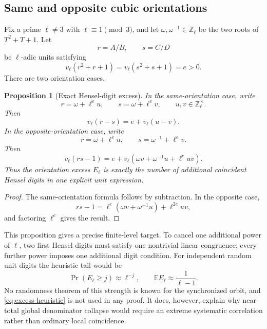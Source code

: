 \documentclass[11pt]{article}
\newtheorem{proposition}[theorem]{Proposition}
\theoremstyle{definition}
\theoremstyle{remark}
\newcommand{\Z}{\mathbb{Z}}
\begin{document}
\subsection{Same and opposite cubic orientations}

Fix a prime $\ell\ne3$ with $\ell\equiv1\pmod3$, and let $\omega,\omega^{-1}\in\Z_\ell$ be the two roots of $T^2+T+1$.  Let
\[
 r=A/B,
 \qquad s=C/D
\]
be $\ell$-adic units satisfying
\[
 v_\ell(r^2+r+1)=v_\ell(s^2+s+1)=e>0.
\]
There are two orientation cases.

\begin{proposition}[Exact Hensel-digit excess]\label{prop:Hensel-excess}
In the same-orientation case, write
\begin{equation}\label{eq:same-Hensel}
 r=\omega+\ell^e u,
 \qquad
 s=\omega+\ell^e v,
 \qquad u,v\in\Z_\ell^\times.
\end{equation}
Then
\begin{equation}\label{eq:same-excess}
 v_\ell(r-s)=e+v_\ell(u-v).
\end{equation}
In the opposite-orientation case, write
\begin{equation}\label{eq:opp-Hensel}
 r=\omega+\ell^e u,
 \qquad
 s=\omega^{-1}+\ell^e v.
\end{equation}
Then
\begin{equation}\label{eq:opp-excess}
 v_\ell(rs-1)
 =e+v_\ell\!\left(\omega v+\omega^{-1}u+\ell^euv\right).
\end{equation}
Thus the orientation excess $E_\ell$ is exactly the number of additional coincident Hensel digits in one explicit unit expression.
\end{proposition}

\begin{proof}
The same-orientation formula follows by subtraction.  In the opposite case,
\[
 rs-1
 =\ell^e(\omega v+\omega^{-1}u)+\ell^{2e}uv,
\]
and factoring $\ell^e$ gives the result.
\end{proof}

This proposition gives a precise finite-level target.  To cancel one additional power of $\ell$, two first Hensel digits must satisfy one nontrivial linear congruence; every further power imposes one additional digit condition.  For independent random unit digits the heuristic tail would be
\begin{equation}\label{eq:excess-heuristic}
 \Pr(E_\ell\ge j)\approx\ell^{-j},
 \qquad
 \mathbb E E_\ell\approx\frac1{\ell-1}.
\end{equation}
No randomness theorem of this strength is known for the synchronized orbit, and \eqref{eq:excess-heuristic} is not used in any proof.  It does, however, explain why near-total global denominator collapse would require an extreme systematic correlation rather than ordinary local coincidence.
\end{document}
